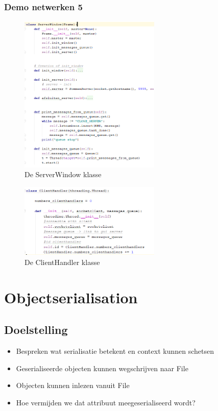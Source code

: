 \documentclass{article}
\begin{document}
\subsubsection{Demo netwerken 5}

\begin{figure}[H]
    \centering
    \includegraphics[width=0.6\textwidth]{multithreaded-server-gui-python.png}
    \caption{De ServerWindow klasse}
\end{figure}

\begin{figure}[H]
    \centering
    \includegraphics[width=0.6\textwidth]{multithreaded-server-gui-python2.png}
    \caption{De ClientHandler klasse}
\end{figure}

\section{Objectserialisation}

\subsection{Doelstelling}

\begin{itemize}
    \item Bespreken wat serialisatie betekent en context kunnen schetsen
    \item Geserialiseerde objecten kunnen wegschrijven naar File
    \item Objecten kunnen inlezen vanuit File
    \item Hoe vermijden we dat attribuut meegeserialiseerd wordt?
\end{itemize}
\end{document}

